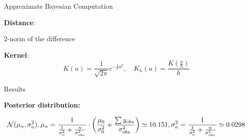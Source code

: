 \documentclass{beamer}
\begin{document}
\begin{section}{Approximate Bayesian Computation}
\begin{frame}
{\textbf{Distance}: 
\begin{center}
	2-norm of the difference
\end{center}   %

\textbf{Kernel}: 
$$
K(u) = 
\frac{1}{\sqrt{2\pi}} e^{-\frac{1}{2}u^2}, 
\quad K_h(u) 
= \frac{K(\frac u h)}{h}
$$
}
\end{frame}


\begin{frame}{Results}

	{\small
		\textbf{Posterior distribution:}
		
		$$
		\mathcal{N}(\mu_n, \sigma^2_n), 
		\vspace{0.3cm}
		\mu_n 
		= \frac{1}{ \frac{1}{\sigma_0^2} + \frac{n}{\sigma_{obs}^2} } 
		\cdot \left(\frac{\mu_0}{\sigma_0^2} + \frac{\sum y_{obs}}{\sigma_{obs}^2}\right)
		\simeq 10.151,
		\vspace{0.3cm}
		\sigma^2_n
		= \frac{1}{ \frac{1}{\sigma_0^2} + \frac{n}{\sigma_{obs}^2} } 
		\simeq 0.0298
		$$
	}




\end{frame}
\end{section}
\end{document}
